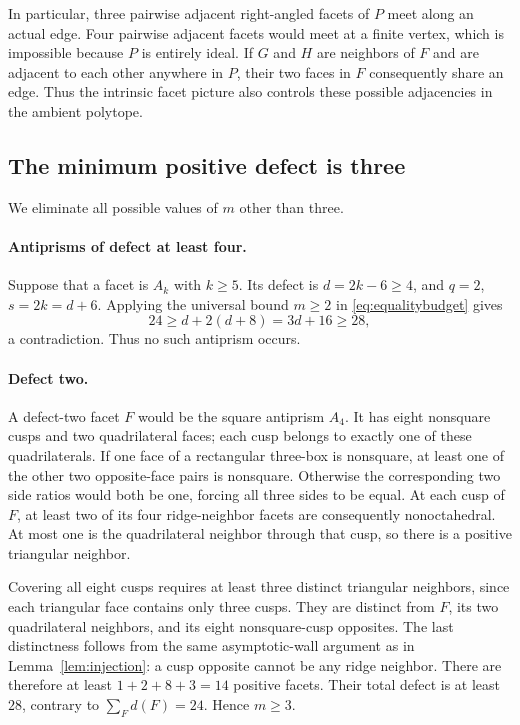 \documentclass[11pt]{article}
\theoremstyle{remark}
\begin{document}
In particular, three pairwise adjacent right-angled facets of $P$
meet along an actual edge. Four pairwise adjacent facets would meet
at a finite vertex, which is impossible because $P$ is entirely
ideal. If $G$ and $H$ are neighbors of $F$ and are adjacent to each
other anywhere in $P$, their two faces in $F$ consequently share
an edge. Thus the intrinsic facet picture also controls these
possible adjacencies in the ambient polytope.

\subsection{The minimum positive defect is three}\label{first-reduction-the-minimum-positive-defect-is-three}

We eliminate all possible values of $m$ other than three.

\paragraph{Antiprisms of defect at least four.}
Suppose that a facet is $A_k$ with $k\ge5$. Its defect is
$d=2k-6\ge4$, and $q=2$, $s=2k=d+6$. Applying the universal
bound $m\ge2$ in \eqref{eq:equalitybudget} gives
\[
 24\ge d+2(d+8)=3d+16\ge28,
\]
a contradiction. Thus no such antiprism occurs.

\paragraph{Defect two.}
A defect-two facet $F$ would be the square antiprism $A_4$.
It has eight nonsquare cusps and two quadrilateral faces; each cusp
belongs to exactly one of these quadrilaterals. If one face of a
rectangular three-box is nonsquare, at least one of the other two
opposite-face pairs is nonsquare. Otherwise the corresponding two
side ratios would both be one, forcing all three sides to be equal.
At each cusp of $F$, at least two of its four ridge-neighbor facets
are consequently nonoctahedral. At most one is the quadrilateral
neighbor through that cusp, so there is a positive triangular
neighbor.

Covering all eight cusps requires at least three distinct triangular
neighbors, since each triangular face contains only three cusps.
They are distinct from $F$, its two quadrilateral neighbors, and its
eight nonsquare-cusp opposites. The last distinctness follows from
the same asymptotic-wall argument as in
Lemma~\ref{lem:injection}: a cusp opposite cannot be any ridge
neighbor. There are therefore at least
$1+2+8+3=14$ positive facets. Their total defect is at least $28$,
contrary to $\sum_Fd(F)=24$. Hence $m\ge3$.
\end{document}
